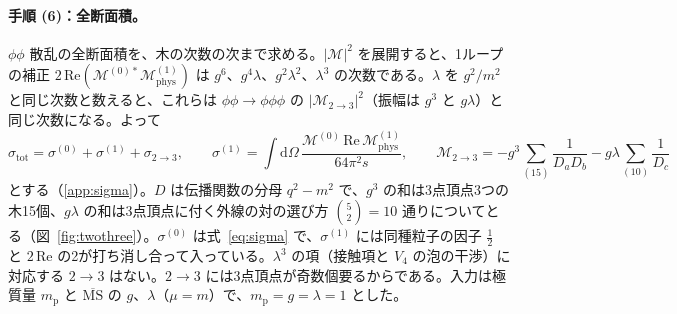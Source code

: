 \documentclass[a4paper,10pt]{ltjsarticle}
\newcommand{\dd}{\mathrm{d}}
\begin{document}
\paragraph{手順 (6)：全断面積。}$\phi\phi$ 散乱の全断面積を、木の次数の次まで求める。$|\mathcal{M}|^2$ を展開すると、1ループの補正 $2\,\mathrm{Re}(\mathcal{M}^{(0)*}\mathcal{M}^{(1)}_{\mathrm{phys}})$ は $g^6$、$g^4\lambda$、$g^2\lambda^2$、$\lambda^3$ の次数である。$\lambda$ を $g^2/m^2$ と同じ次数と数えると、これらは $\phi\phi\to\phi\phi\phi$ の $|\mathcal{M}_{2\to3}|^2$（振幅は $g^3$ と $g\lambda$）と同じ次数になる。よって
\begin{equation}
\sigma_{\mathrm{tot}}=\sigma^{(0)}+\sigma^{(1)}+\sigma_{2\to3},\qquad
\sigma^{(1)}=\int\!\dd\Omega\,\frac{\mathcal{M}^{(0)}\,\mathrm{Re}\,\mathcal{M}^{(1)}_{\mathrm{phys}}}{64\pi^2s},\qquad
\mathcal{M}_{2\to3}=-g^3\sum_{(15)}\frac{1}{D_aD_b}-g\lambda\sum_{(10)}\frac{1}{D_c}
\label{eq:sigmatot}
\end{equation}
とする（\ref{app:sigma}）。$D$ は伝播関数の分母 $q^2-m^2$ で、$g^3$ の和は3点頂点3つの木15個、$g\lambda$ の和は3点頂点に付く外線の対の選び方 $\binom52=10$ 通りについてとる（図~\ref{fig:twothree}）。$\sigma^{(0)}$ は式~\eqref{eq:sigma} で、$\sigma^{(1)}$ には同種粒子の因子 $\frac12$ と $2\,\mathrm{Re}$ の2が打ち消し合って入っている。$\lambda^3$ の項（接触項と $V_4$ の泡の干渉）に対応する $2\to3$ はない。$2\to3$ には3点頂点が奇数個要るからである。入力は極質量 $m_{\mathrm p}$ と $\overline{\mathrm{MS}}$ の $g$、$\lambda$（$\mu=m$）で、$m_{\mathrm p}=g=\lambda=1$ とした。
\end{document}
